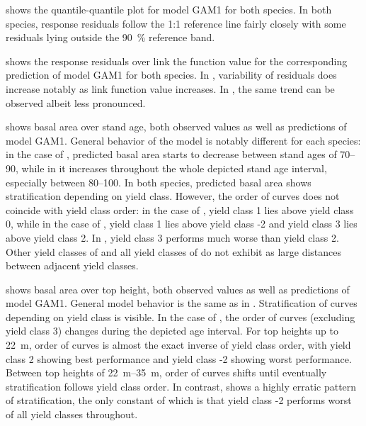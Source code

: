  shows the quantile-quantile plot for model GAM1 for both species.  In both species, response residuals follow the 1:1 reference line fairly closely with some residuals lying outside the \SI{90}{\percent} reference band.

 shows the response residuals over link the function value for the corresponding prediction of model GAM1 for both species.  In \Beech{}, variability of residuals does increase notably as link function value increases.  In \Spruce{}, the same trend can be observed albeit less pronounced.

 shows basal area over stand age, both observed values as well as predictions of model GAM1.  General behavior of the model is notably different for each species:  in the case of \Beech{}, predicted basal area starts to decrease between stand ages of \SIrange{70}{90}{\year}, while in \Spruce{} it increases throughout the whole depicted stand age interval, especially between \SIrange{80}{100}{\year}.  In both species, predicted basal area shows stratification depending on yield class.  However, the order of curves does not coincide with yield class order:  in the case of \Beech{}, yield class 1 lies above yield class 0, while in the case of \Spruce{}, yield class 1 lies above yield class -2 and yield class 3 lies above yield class 2.  In \Beech{}, yield class 3 performs much worse than yield class 2.  Other yield classes of \Beech{} and all yield classes of \Spruce{} do not exhibit as large distances between adjacent yield classes. 

 shows basal area over top height, both observed values as well as predictions of model GAM1.  General model behavior is the same as in .  Stratification of curves depending on yield class is visible.  In the case of \Beech{}, the order of curves (excluding yield class 3) changes during the depicted age interval.  For top heights up to \SI{22}{\meter}, order of curves is almost the exact inverse of yield class order, with yield class 2 showing best performance and yield class -2 showing worst performance.  Between top heights of \SIrange{22}{35}{\meter}, order of curves shifts until eventually stratification follows yield class order.  In contrast, \Spruce{} shows a highly erratic pattern of stratification, the only constant of which is that yield class -2 performs worst of all yield classes throughout.

